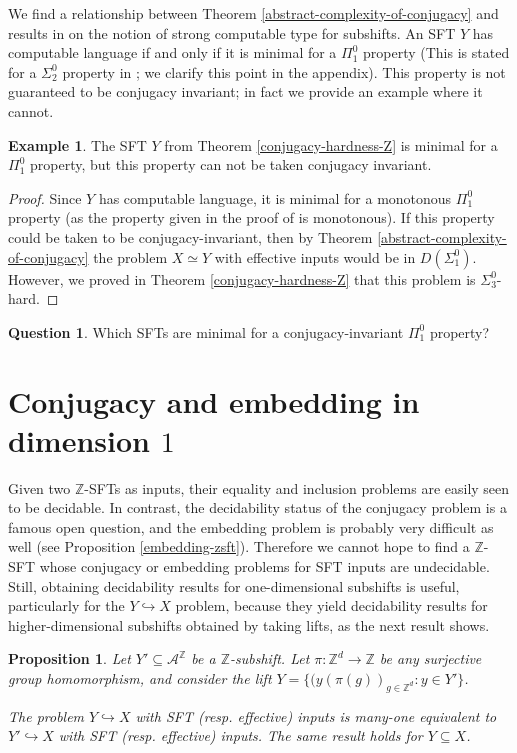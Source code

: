 \documentclass[a4paper]{article}
\newcommand{\Z}{\mathbb{Z}}
\newcommand{\A}{\mathcal{A}}
\newtheorem{proposition}[theorem]{Proposition}
\theoremstyle{definition}
\newtheorem{example}[theorem]{Example}
\newtheorem{question}[theorem]{Question}
\begin{document}
We find a relationship between Theorem \ref{abstract-complexity-of-conjugacy} and results in \cite{amir_minimality_2025} on the notion of strong computable type for subshifts. 
An SFT $Y$ has computable language if and only if it is minimal for a $\Pi_1^0$ property (This is stated for a $\Sigma^0_2$ property in \cite[Corollary 13]{amir_minimality_2025}; we clarify this point in the appendix). This property is not guaranteed to be conjugacy invariant; in fact we provide an example where it cannot.
\begin{example}
The SFT $Y$ from Theorem \ref{conjugacy-hardness-Z} is minimal for a $\Pi^0_1$ property, but this property can not be taken conjugacy invariant. 
\end{example}
\begin{proof} Since $Y$ has computable language, it is minimal for a monotonous $\Pi_1^0$ property (as the property given in the proof of \cite[Corollary 13]{amir_minimality_2025} is monotonous). If this property could be taken to be conjugacy-invariant, then by Theorem \ref{abstract-complexity-of-conjugacy} the problem $X\simeq Y$ with effective inputs would be in $D(\Sigma_1^0)$. However, we proved in Theorem \ref{conjugacy-hardness-Z} that this problem is $\Sigma_3^0$-hard. 
\end{proof}
\begin{question}
    Which SFTs are minimal for a conjugacy-invariant $\Pi_1^0$ property? 
\end{question}

\section{Conjugacy and embedding in dimension $1$}\label{sec:dim1}

Given two $\Z$-SFTs as inputs, their equality and inclusion problems are easily seen to be decidable. In contrast, the decidability status of the conjugacy problem is a famous open question, and the embedding problem is probably very difficult as well (see Proposition \ref{embedding-zsft}). Therefore we cannot hope to find a $\Z$-SFT whose conjugacy or embedding problems for SFT inputs are undecidable. Still, obtaining decidability results for one-dimensional subshifts is useful, particularly for the $Y \hookrightarrow X$ problem, because they yield decidability results for higher-dimensional subshifts obtained by taking lifts, as the next result shows.

\begin{proposition}\label{embedding-of-lift-sfts-is-decidable}
    Let $Y'\subseteq \A^{\Z}$ be a $\Z$-subshift. Let $\pi\colon\mathbb{Z}^d\to \mathbb{Z}$ be any surjective group homomorphism, and consider the lift $Y=\{(y(\pi(g))_{g\in\mathbb{Z}^d} : y\in  Y'\}$.
    
    The problem $Y \hookrightarrow X$ with SFT (resp. effective) inputs is many-one equivalent to $Y' \hookrightarrow X$ with SFT (resp. effective) inputs.
    The same result holds for $Y \subseteq X$.
\end{proposition}
\end{document}
